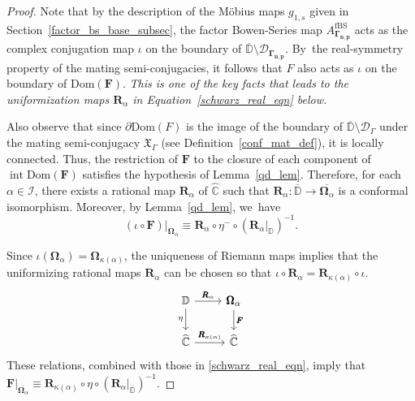 \documentclass[JEP,XML,SOM,Unicode,NoFloatCountersInSection,published]{cedram}
\theoremstyle{definition}
\theoremstyle{remark}
\newcommand{\C}{\mathbb{C}}
\newcommand{\D}{\mathbb{D}}
\DeclareMathOperator{\Int}{int}
\begin{document}
\begin{proof}
Note that by the description of the Möbius maps $g_{1,s}$ given in Section~\ref{factor_bs_base_subsec}, the factor Bowen-Series map $A_{\pmb{\Gamma_{n,p}}}^{\mathrm{fBS}}$ acts as the complex conjugation map $\iota$ on the boundary of $\overline{\D}\setminus\mathcal{D}_{\pmb{\Gamma_{n,p}}}$. By~the real-symmetry property of the mating semi-conjugacies, it follows that $F$ also acts as $\iota$ on the boundary of $\mathrm{Dom}(\pmb{F})$. \emph{This is one of the key facts that
leads to the uniformization maps $\pmb{R}_\alpha$ in Equation~\ref{schwarz_real_eqn} below.}

Also observe that since $\partial\mathrm{Dom}(F)$ is the image of the boundary of $\overline{\D}\setminus \mathcal{D}_{\Gamma}$ under the mating semi-conjugacy $\mathfrak{X}_\Gamma$ (see Definition~\ref{conf_mat_def}), it is locally connected. Thus, the restriction of $\pmb{F}$ to the closure of each component of $\Int{\mathrm{Dom}(\pmb{F})}$ satisfies the hypothesis of Lemma~\ref{qd_lem}. Therefore, for each $\alpha\in\mathcal{I}$, there exists a rational map $\pmb{R}_\alpha$ of $\widehat{\C}$ such that $\pmb{R}_\alpha:\overline{\D}\to\overline{\pmb{\Omega}_\alpha}$ is a conformal isomorphism.
Moreover, by Lemma~\ref{qd_lem}, we~have
\begin{equation}
\left(\iota\circ \pmb{F}\right)\vert_{\pmb{\Omega}_\alpha}\equiv \pmb{R}_\alpha\circ\eta^-\circ\left(\pmb{R}_\alpha\vert_{\D}\right)^{-1}.
\label{schwarz_real_eqn}
\end{equation}

Since $\iota(\pmb{\Omega}_\alpha)=\pmb{\Omega}_{\kappa(\alpha)}$, the uniqueness of Riemann maps implies that the uniformizing rational maps $\pmb{R}_\alpha$ can be chosen so that $\iota\circ\pmb{R}_\alpha=\pmb{R}_{\kappa(\alpha)}\circ\iota$.
\[
\begin{tikzcd}
\D \arrow{d}[swap]{\eta} \arrow{r}{\pmb{R}_\alpha} & \pmb{\Omega}_\alpha \arrow{d}{\pmb{F}} \\
\widehat{\C} \arrow{r}{\pmb{R}_{\kappa(\alpha)}} & \widehat{\mathbb{C}}
\end{tikzcd}
\]
These relations, combined with those in \eqref{schwarz_real_eqn}, imply that $
\pmb{F}\vert_{\overline{\pmb{\Omega}_\alpha}}\equiv \pmb{R}_{\kappa(\alpha)}\circ\eta\circ(\pmb{R}_{\alpha}\vert_{\overline{\D}})^{-1}.$
\end{proof}
\end{document}

